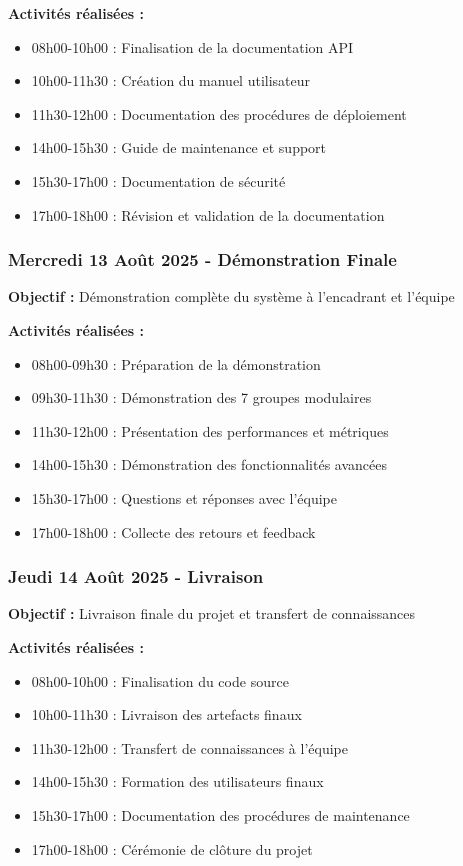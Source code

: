 \textbf{Activités réalisées :}
\begin{itemize}
    \item 08h00-10h00 : Finalisation de la documentation API
    \item 10h00-11h30 : Création du manuel utilisateur
    \item 11h30-12h00 : Documentation des procédures de déploiement
    \item 14h00-15h30 : Guide de maintenance et support
    \item 15h30-17h00 : Documentation de sécurité
    \item 17h00-18h00 : Révision et validation de la documentation
\end{itemize}

\subsubsection{Mercredi 13 Août 2025 - Démonstration Finale}
\textbf{Objectif :} Démonstration complète du système à l'encadrant et l'équipe

\textbf{Activités réalisées :}
\begin{itemize}
    \item 08h00-09h30 : Préparation de la démonstration
    \item 09h30-11h30 : Démonstration des 7 groupes modulaires
    \item 11h30-12h00 : Présentation des performances et métriques
    \item 14h00-15h30 : Démonstration des fonctionnalités avancées
    \item 15h30-17h00 : Questions et réponses avec l'équipe
    \item 17h00-18h00 : Collecte des retours et feedback
\end{itemize}

\subsubsection{Jeudi 14 Août 2025 - Livraison}
\textbf{Objectif :} Livraison finale du projet et transfert de connaissances

\textbf{Activités réalisées :}
\begin{itemize}
    \item 08h00-10h00 : Finalisation du code source
    \item 10h00-11h30 : Livraison des artefacts finaux
    \item 11h30-12h00 : Transfert de connaissances à l'équipe
    \item 14h00-15h30 : Formation des utilisateurs finaux
    \item 15h30-17h00 : Documentation des procédures de maintenance
    \item 17h00-18h00 : Cérémonie de clôture du projet
\end{itemize}

